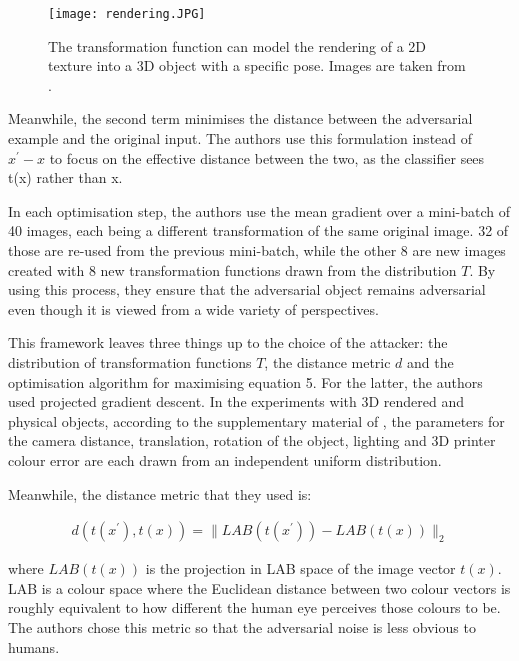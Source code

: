 \documentclass[11pt, a4paper, oneside]{article}
\begin{document}
\begin{figure}[h]
    \centering
    \texttt{[image: rendering.JPG]}
    \caption{The transformation function can model the rendering of a 2D texture into a 3D object with a specific pose. Images are taken from \cite{athalye}.}
    \label{fig:rendering}
\end{figure}

Meanwhile, the second term minimises the distance between the adversarial example and the original input. The authors use this formulation instead of $x^\prime - x$ to focus on the effective distance between the two, as the classifier sees t(x) rather than x.

In each optimisation step, the authors use the mean gradient over a mini-batch of 40 images, each being a different transformation of the same original image. 32 of those are re-used from the previous mini-batch, while the other 8 are new images created with 8 new transformation functions drawn from the distribution $T$. By using this process, they ensure that the adversarial object remains adversarial even though it is viewed from a wide variety of perspectives.

This framework leaves three things up to the choice of the attacker: the distribution of transformation functions $T$, the distance metric $d$ and the optimisation algorithm for maximising equation 5. For the latter, the authors used projected gradient descent. In the experiments with 3D rendered and physical objects, according to the supplementary material of \cite{athalye}, the parameters for the camera distance, translation, rotation of the object, lighting and 3D printer colour error are each drawn from an independent uniform distribution.

Meanwhile, the distance metric that they used is:

\begin{equation}
\begin{aligned}
d(t(x^\prime), t(x)) = \|LAB(t(x^\prime)) - LAB(t(x))\|_2
\end{aligned}
\end{equation}

\noindent where $LAB(t(x))$ is the projection in LAB space of the image vector $t(x)$. LAB is a colour space where the Euclidean distance between two colour vectors is roughly equivalent to how different the human eye perceives those colours to be. The authors chose this metric so that the adversarial noise is less obvious to humans.
\end{document}
